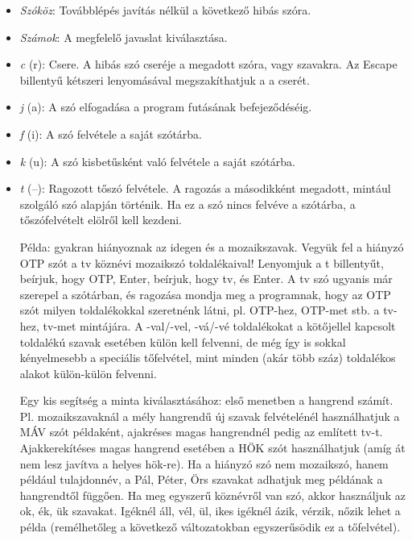 \begin{itemize}
\item  \emph{Szóköz}: Továbblépés javítás nélkül a következő hibás szóra.

\item  \emph{Számok}: A megfelelő javaslat kiválasztása.

\item  \emph{c} (r):      Csere. A hibás szó cseréje a megadott  szóra,  vagy
              szavakra.     Az    Escape    billentyű    kétszeri
              lenyomásával megszakíthatjuk a a cserét.

       \item  \emph{j} (a):            A    szó    elfogadása    a    program    futásának
              befejeződéséig.

\item  \emph{f} (i):            A szó felvétele a saját szótárba.

\item  \emph{k} (u):            A szó kisbetűsként való felvétele a saját szótárba.

\item  \emph{t} (--):            Ragozott tőszó felvétele. A ragozás  a  másodikként
              megadott,  mintául  szolgáló  szó alapján történik.
              Ha  ez  a  szó  nincs   felvéve   a   szótárba,   a
              tőszófelvételt elölről kell kezdeni.

              Példa:   gyakran   hiányoznak   az   idegen   és  a
              mozaikszavak. Vegyük fel a hiányzó OTP  szót  a  tv
              köznévi  mozaikszó  toldalékaival!   Lenyomjuk  a t
              billentyűt, beírjuk, hogy OTP, Enter, beírjuk, hogy
              tv,  és  Enter.  A  tv  szó  ugyanis már szerepel a
              szótárban, és ragozása  mondja  meg  a  programnak,
              hogy  az  OTP  szót milyen toldalékokkal szeretnénk
              látni, pl.  OTP-hez, OTP-met stb. a tv-hez,  tv-met
              mintájára.   A  -val/-vel,  -vá/-vé  toldalékokat a
              kötőjellel kapcsolt toldalékú szavak esetében külön
              kell  felvenni, de még így is sokkal kényelmesebb a
              speciális tőfelvétel, mint minden (akár több  száz)
              toldalékos alakot külön-külön felvenni.

              Egy  kis  segítség  a  minta  kiválasztásához: első
              menetben a hangrend számít. Pl.  mozaikszavaknál  a
              mély hangrendű új szavak felvételénél használhatjuk
              a MÁV szót példaként, ajakréses  magas  hangrendnél
              pedig   az  említett  tv-t.  Ajakkerekítéses  magas
              hangrend esetében a HÖK szót használhatjuk (amíg át
              nem lesz javítva a helyes hök-re). Ha a hiányzó szó
              nem mozaikszó, hanem például  tulajdonnév,  a  Pál,
              Péter,   Örs   szavakat  adhatjuk  meg  példának  a
              hangrendtől függően. Ha meg egyszerű köznévről  van
              szó,  akkor  használjuk  az  ok,  ék,  ük szavakat.
              Igéknél áll, vél, ül, ikes  igéknél  ázik,  vérzik,
              nőzik  lehet  a  példa  (remélhetőleg  a  következő
              változatokban egyszerűsödik ez a tőfelvétel).


\end{itemize}
